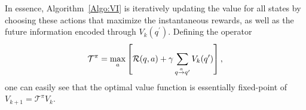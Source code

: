 In essence, Algorithm~\ref{Algo:VI} is iteratively updating the value for all states by choosing these actions that maximize the instantaneous rewards, as well as the future information encoded through $V_{k}(q^{\prime})$. Defining the operator $$\mathcal{T}^{\pi} = \max_{a} \left[\mathcal{R}(q, a) + \gamma \sum_{q \goesto[a]q^{\prime}}V_{k}(q^{\prime})\right],$$ one can easily see that the optimal value function is essentially  fixed-point of $V_{k+1} = \mathcal{T}^{\pi}  V_{k}$. 